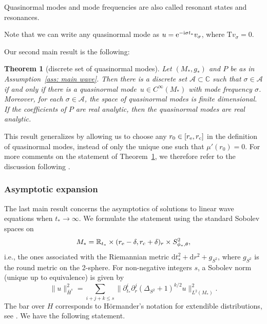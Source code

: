 \documentclass[pdftex]{sigma}
\newcommand{\A}{\mathcal A}
\newcommand{\de}{\delta}
\newcommand{\T}{\mathrm T}
\newcommand{\md}{\mathrm d}
\newcommand{\s}{\sigma}
\newcommand{\R}[0]{\mathbb{R}}
\newcommand{\C}[0]{\mathbb{C}}
\numberwithin{equation}{section}
\newtheorem{Theorem}{Theorem}[section]
\begin{document}
\begin{Remark}
Quasinormal modes and mode frequencies are also called resonant states and resonances.
\end{Remark}
\begin{Remark}
Note that we can write any quasinormal mode as
$
	u = {\rm e}^{-{\rm i} \s t_*}v_\s$,
where $\T v_\s = 0$.
\end{Remark}

Our second main result is the following:

\begin{Theorem}[discrete set of quasinormal modes] \label{thm: QNMs}
Let $(M_*, g_*)$ and $P$ be as in Assumption~{\rm\ref{ass: main wave}}.
Then there is a discrete set $\A \subset \C$ such that $\s \in \A$
if and only if there is a quasinormal mode~${u \in C^\infty(M_*)}$
with mode frequency $\s$.
Moreover, for each $\s \in \A$, the space of quasinormal modes is finite dimensional.
If the coefficients of $P$ are real analytic, then the quasinormal modes are real analytic.
\end{Theorem}

\noindent
This result generalizes \cite[Theorem~1.5]{PV2023} by allowing us to choose any $r_0 \in [r_{\rm e}, r_{\rm c}]$ in the definition of quasinormal modes, instead of only the unique one such that $\mu'(r_0) = 0$.
For more comments on the statement of Theorem~\ref{thm: QNMs}, we therefore refer to the discussion following \cite[Theorem~1.5]{PV2023}.





\subsubsection{Asymptotic expansion}

The last main result concerns the asymptotics of solutions to linear wave equations when $t_* \to \infty$.
We formulate the statement using the standard Sobolev spaces on
\[
	M_*
		= \R_{t_*} \times (r_{\rm e} - \de, r_{\rm c} + \de)_r \times S^2_{\phi_*, \theta},
\]
i.e., the ones associated with the Riemannian metric $\md t_*^2 + \md r^2 + g_{S^2}$,
where $g_{S^2}$ is the round metric on the 2-sphere.
For non-negative integers $s$, a Sobolev norm (unique up to equivalence) is given by
\[
	\|u\|_{\bar H^s}^2=\sum_{i + j + k \leq s} \bigl\|\partial_{t_*}^i \partial_r^j \left( \Delta_{S^2}+1\right)^{k/2} u\bigr\|^2_{L^2(M_*)}.
\]
The bar over $H$ corresponds to H\"ormander's notation for
extendible distributions, see \cite{HorIII}.
We have the following statement.
\end{document}
